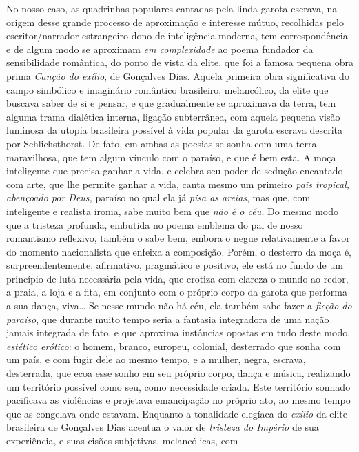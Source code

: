 No nosso caso, as quadrinhas populares cantadas pela linda garota
escrava, na origem desse grande processo de aproximação e interesse
mútuo, recolhidas pelo escritor/narrador estrangeiro dono de
inteligência moderna, tem correspondência e de algum modo se aproximam
\emph{em complexidade} ao poema fundador da sensibilidade romântica, do
ponto de vista da elite, que foi a famosa pequena obra prima
\emph{Canção do exílio}, de Gonçalves Dias. Aquela primeira obra
significativa do campo simbólico e imaginário romântico brasileiro,
melancólico, da elite que buscava saber de si e pensar, e que
gradualmente se aproximava da terra, tem alguma trama dialética interna,
ligação subterrânea, com aquela pequena visão luminosa da utopia
brasileira possível à vida popular da garota escrava descrita por
Schlichsthorst. De fato, em ambas as poesias se sonha com uma terra
maravilhosa, que tem algum vínculo com o paraíso, e que é bem esta. A
moça inteligente que precisa ganhar a vida, e celebra seu poder de
sedução encantado com arte, que lhe permite ganhar a vida, canta mesmo
um primeiro \emph{pais tropical, abençoado por Deus,} paraíso no qual
ela já \emph{pisa as areias}, mas que, com inteligente e realista
ironia, sabe muito bem que \emph{não é o céu.} Do mesmo modo que a
tristeza profunda, embutida no poema emblema do pai de nosso romantismo
reflexivo, também o sabe bem, embora o negue relativamente a favor do
momento nacionalista que enfeixa a composição. Porém, o desterro da moça
é, surpreendentemente, afirmativo, pragmático e positivo, ele está no
fundo de um princípio de luta necessária pela vida, que erotiza com
clareza o mundo ao redor, a praia, a loja e a fita, em conjunto com o
próprio corpo da garota que performa a sua dança, viva\ldots{} Se nesse mundo
não há céu, ela também sabe fazer a \emph{ficção do paraíso}, que
durante muito tempo seria a fantasia integradora de uma nação jamais
integrada de fato, e que aproxima instâncias opostas em tudo deste modo,
\emph{estético erótico}: o homem, branco, europeu, colonial, desterrado
que sonha com um país, e com fugir dele ao mesmo tempo, e a mulher,
negra, escrava, desterrada, que ecoa esse sonho em seu próprio corpo,
dança e música, realizando um território possível como seu, como
necessidade criada. Este território sonhado pacificava as violências e
projetava emancipação no próprio ato, ao mesmo tempo que as congelava
onde estavam. Enquanto a tonalidade elegíaca do \emph{exílio} da elite
brasileira de Gonçalves Dias acentua o valor de \emph{tristeza do
Império} de sua experiência, e suas cisões subjetivas, melancólicas, com
